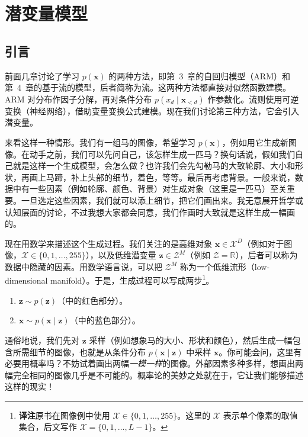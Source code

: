 \chapter{潜变量模型}
\label{ch:latent-variables}

\section{引言}
前面几章讨论了学习 $p(\mathbf{x})$ 的两种方法，即第~3~章的自回归模型（ARM）和第~4~章的基于流的模型，后者简称为流。这两种方法都直接对似然函数建模。ARM 对分布作因子分解，再对条件分布 $p(x_d\mid\mathbf{x}_{<d})$ 作参数化。流则使用可逆变换（神经网络），借助变量变换公式建模。现在我们讨论第三种方法，它会引入潜变量。

来看这样一种情形。我们有一组马的图像，希望学习 $p(\mathbf{x})$，例如用它生成新图像。在动手之前，我们可以先问自己，该怎样生成一匹马？换句话说，假如我们自己就是这样一个生成模型，会怎么做？也许我们会先勾勒马的大致轮廓、大小和形状，再画上马蹄，补上头部的细节，着色，等等。最后再考虑背景。一般来说，数据中有一些因素（例如轮廓、颜色、背景）对生成对象（这里是一匹马）至关重要。一旦选定这些因素，我们就可以添上细节，把它们画出来。我无意展开哲学或认知层面的讨论，不过我想大家都会同意，我们作画时大致就是这样生成一幅画的。

现在用数学来描述这个生成过程。我们关注的是高维对象 $\mathbf{x}\in\mathcal{X}^{D}$（例如对于图像，$\mathcal{X}\in\{0,1,\ldots,255\}$），以及低维潜变量 $\mathbf{z}\in\mathcal{Z}^{M}$（例如 $\mathcal{Z}=\mathbb{R}$），后者可以称为数据中隐藏的因素。用数学语言说，可以把 $\mathcal{Z}^{M}$ 称为一个低维流形（low-dimensional manifold）。于是，生成过程可以写成两步\footnote{\textbf{译注}\quad 原书在图像例中使用 $\mathcal{X}\in\{0,1,\ldots,255\}$。这里的 $\mathcal{X}$ 表示单个像素的取值集合，后文写作 $\mathcal{X}=\{0,1,\ldots,L-1\}$。}。
\begin{enumerate}
\item $\mathbf{z}\sim p(\mathbf{z})$（中的红色部分）。
\item $\mathbf{x}\sim p(\mathbf{x}\mid\mathbf{z})$（中的蓝色部分）。
\end{enumerate}


通俗地说，我们先对 $\mathbf{z}$ 采样（例如想象马的大小、形状和颜色），然后生成一幅包含所需细节的图像，也就是从条件分布 $p(\mathbf{x}\mid\mathbf{z})$ 中采样 $\mathbf{x}$。你可能会问，这里有必要用概率吗？不妨试着画出两幅\emph{一模一样}的图像。外部因素多种多样，想画出两幅完全相同的图像几乎是不可能的。概率论的美妙之处就在于，它让我们能够描述这样的现实！

